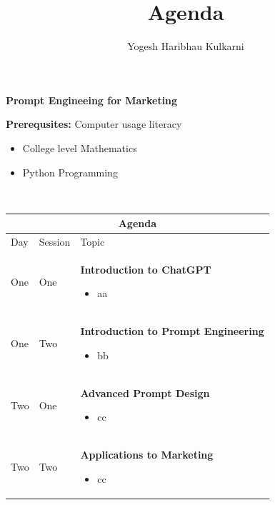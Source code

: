 \documentclass[a4paper, 11pt]{article}
\title{Agenda}
\author{Yogesh Haribhau Kulkarni}
\begin{document}
\pagestyle{mystyle}

\makebox[\linewidth]{\rule{\linewidth}{1pt}}
\begin{center} 
\textbf{\Large Prompt Engineeing for Marketing}
\end{center}
\makebox[\linewidth]{\rule{\linewidth}{1pt}}

\textbf{Prerequsites:} Computer usage literacy
\begin{itemize}[topsep=0pt, partopsep=0pt, itemsep=0pt, parsep=0pt]
\item College level Mathematics
\item Python Programming
\end{itemize}

\makebox[\linewidth]{\rule{\linewidth}{0.4pt}}\\

\begin{center} 
\begin{tabular}{ |p{1cm}|p{1cm}||p{10cm}|  }
 \hline
 \multicolumn{3}{|c|}{\textbf{\large Agenda}} \\
 \hline
Day & Session & Topic\\
 \hline
 One   &  One    &  \textbf{Introduction to ChatGPT}
\begin{itemize}[topsep=0pt, partopsep=0pt, itemsep=0pt, parsep=0pt]
\item aa
\end{itemize} 
\\
One &   Two  &   \textbf{Introduction to Prompt Engineering}
 \begin{itemize}[topsep=0pt, partopsep=0pt, itemsep=0pt, parsep=0pt]
\item bb
\end{itemize} 
\\
Two   &  One    & \textbf{Advanced Prompt Design}
 \begin{itemize}[topsep=0pt, partopsep=0pt, itemsep=0pt, parsep=0pt]
\item cc
\end{itemize} 
\\
Two  &   Two  & \textbf{Applications to Marketing}
 \begin{itemize}[topsep=0pt, partopsep=0pt, itemsep=0pt, parsep=0pt]
\item cc
\end{itemize} 
\\
 \hline
\end{tabular}
\end{center}
\end{document}
